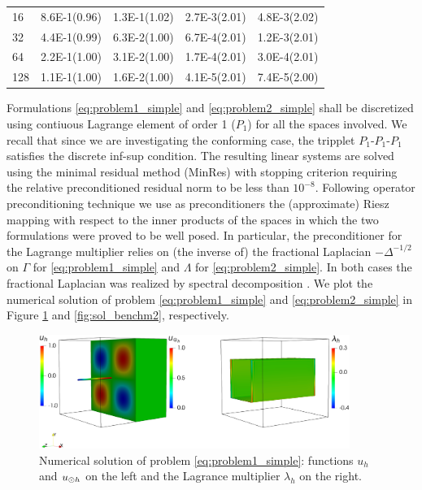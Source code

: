 \begin{table}
\begin{minipage}[b]{0.63\textwidth}
{\begin{center}
\begin{tabular}{l|llll}
16  & 8.6E-1(0.96) & 1.3E-1(1.02) & 2.7E-3(2.01) & 4.8E-3(2.02)\\
32  & 4.4E-1(0.99) & 6.3E-2(1.00) & 6.7E-4(2.01) & 1.2E-3(2.01)\\
64  & 2.2E-1(1.00) & 3.1E-2(1.00) & 1.7E-4(2.01) & 3.0E-4(2.01)\\
128 & 1.1E-1(1.00) & 1.6E-2(1.00) & 4.1E-5(2.01) & 7.4E-5(2.00)\\
\bottomrule
  \end{tabular}
  \end{center}
  }
  \label{tab:error_conform}
  \end{minipage}
\end{table}

Formulations \eqref{eq:problem1_simple} and \eqref{eq:problem2_simple} shall
be discretized using contiuous Lagrange element of order 1 ($P_1$) for all the spaces
involved. We recall that since we are investigating the conforming case, the tripplet
$P_1$-$P_1$-$P_1$ satisfies
the discrete inf-sup condition. The resulting linear systems are solved
using the minimal residual method (MinRes) with stopping criterion requiring the relative
preconditioned residual norm to be less than $10^{-8}$. Following operator
preconditioning technique \cite{mardal2011preconditioning} we use as preconditioners
the (approximate) Riesz mapping with respect to the inner products of
the spaces in which the two formulations were proved to be well posed.
In particular, the preconditioner for the Lagrange multiplier relies on
(the inverse of) the fractional Laplacian $-\Delta^{-1/2}$ on $\Gamma$ for
\eqref{eq:problem1_simple} and $\Lambda$ for \eqref{eq:problem2_simple}.
In both cases the fractional Laplacian was realized by spectral decomposition
\cite{kuchta2016preconditioners}.
We plot the numerical solution of problem \eqref{eq:problem1_simple} and \eqref{eq:problem2_simple} in
Figure \ref{fig:sol_benchm1} and \ref{fig:sol_benchm2}, respectively. 

\begin{figure}
\centering
\includegraphics[width = 0.9\textwidth]{./graphics/mfs_LM2d}
\caption{Numerical solution of problem \eqref{eq:problem1_simple}: functions $u_h$ and $u_{\odot h}$ on the left and the Lagrance multiplier $\lambda_h$ on the right.}\label{fig:sol_benchm1}
\end{figure}

